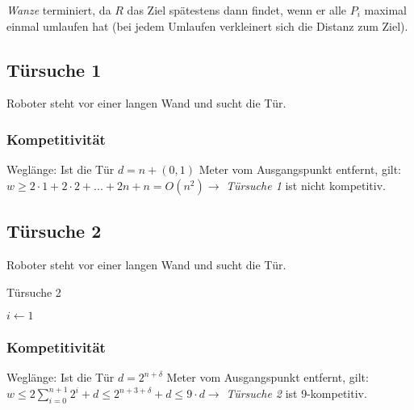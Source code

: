 \textit{Wanze} terminiert, da \(R\) das Ziel spätestens dann findet, wenn er alle \(P_i\) maximal einmal umlaufen hat (bei jedem Umlaufen verkleinert sich die Distanz zum Ziel).


\subsection{Türsuche 1}
Roboter steht vor einer langen Wand und sucht die Tür.
\text{}\\



\subsubsection{Kompetitivität}
Weglänge: Ist die Tür \(d = n + (0,1)\) Meter vom Ausgangspunkt entfernt, gilt:\newline
\(w \geq 2 \cdot 1 + 2 \cdot 2 + ... + 2n +n = O(n^2) \rightarrow\) \textit{Türsuche 1} ist nicht kompetitiv.


\subsection{Türsuche 2}
Roboter steht vor einer langen Wand und sucht die Tür.

\begin{algorithm}[H]
	\caption{Türsuche 2}

	$i \longleftarrow 1$
	\BlankLine
	
\end{algorithm}

\subsubsection{Kompetitivität}
Weglänge: Ist die Tür \(d = 2^{n+\delta}\) Meter vom Ausgangspunkt entfernt, gilt:\newline
\(w \leq 2 \sum\limits_{i=0}^{n+1} 2^i + d \leq 2 ^{n+3+\delta} + d \le 9 \cdot d \rightarrow\) \textit{Türsuche 2} ist 9-kompetitiv.


